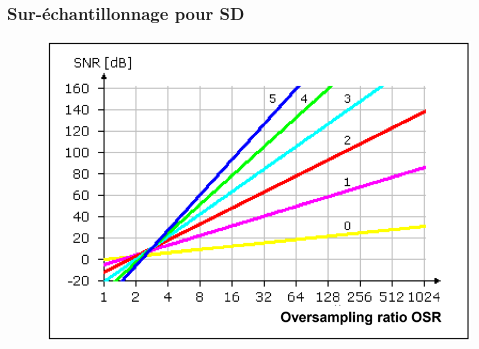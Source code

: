 \documentclass[resume]{subfiles}
\begin{document}
\begin{multicols}{3}
\subsubsection{Sur-échantillonnage pour SD}
\begin{figure}[H]
    \centering
    \includegraphics[width=0.8\columnwidth]{../images/OpAmp1/oversampling.png}
\end{figure}
\end{multicols}
\end{document}
